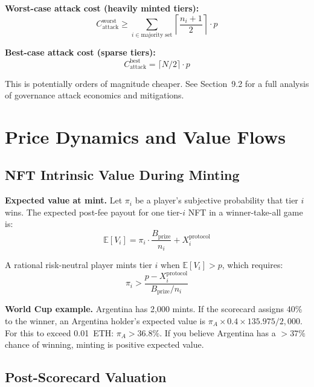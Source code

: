 \documentclass[11pt,a4paper]{article}
\begin{document}
\textbf{Worst-case attack cost (heavily minted tiers):}
\begin{equation}
C_{\text{attack}}^{\text{worst}} \geq \sum_{i \in \text{majority set}} \left\lceil \frac{n_i + 1}{2} \right\rceil \cdot p
\end{equation}

\textbf{Best-case attack cost (sparse tiers):}
\begin{equation}\label{eq:cheapattack}
C_{\text{attack}}^{\text{best}} = \lceil N/2 \rceil \cdot p
\end{equation}

This is potentially orders of magnitude cheaper. See Section~9.2 for a full analysis of governance attack economics and mitigations.

\section{Price Dynamics and Value Flows}

\subsection{NFT Intrinsic Value During Minting}

\textbf{Expected value at mint.} Let $\pi_i$ be a player's subjective probability that tier $i$ wins. The expected post-fee payout for one tier-$i$ NFT in a winner-take-all game is:
\begin{equation}
\mathbb{E}[V_i] = \pi_i \cdot \frac{B_{\text{prize}}}{n_i} + X_i^{\text{protocol}}
\end{equation}

A rational risk-neutral player mints tier $i$ when $\mathbb{E}[V_i] > p$, which requires:
\begin{equation}
\pi_i > \frac{p - X_i^{\text{protocol}}}{B_{\text{prize}} / n_i}
\end{equation}

\textbf{World Cup example.} Argentina has 2,000 mints. If the scorecard assigns 40\% to the winner, an Argentina holder's expected value is $\pi_A \times 0.4 \times 135.975 / 2{,}000$. For this to exceed 0.01~ETH: $\pi_A > 36.8\%$. If you believe Argentina has a $>37\%$ chance of winning, minting is positive expected value.

\subsection{Post-Scorecard Valuation}
\end{document}
